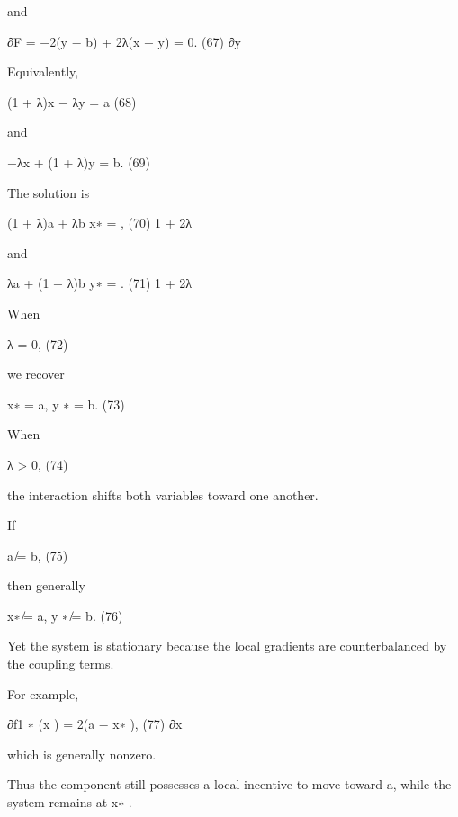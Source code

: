 \documentclass[10pt,a4paper]{article}
\begin{document}
\begin{ManuscriptText}
and

                               ∂F
                                  = −2(y − b) + 2λ(x − y) = 0.    (67)
                               ∂y

Equivalently,


                                      (1 + λ)x − λy = a           (68)

and


                                     −λx + (1 + λ)y = b.          (69)

The solution is

                                            (1 + λ)a + λb
                                     x∗ =                 ,       (70)
                                                1 + 2λ

and

                                            λa + (1 + λ)b
                                     y∗ =                 .       (71)
                                               1 + 2λ

When


                                             λ = 0,               (72)

we recover


                                      x∗ = a,         y ∗ = b.    (73)

When


                                             λ > 0,               (74)

the interaction shifts both variables toward one another.

If


                                             a ̸= b,              (75)

then generally


                                      x∗ ̸= a,        y ∗ ̸= b.   (76)


Yet the system is stationary because the local gradients are counterbalanced by the coupling
terms.

For example,

                                       ∂f1 ∗
                                          (x ) = 2(a − x∗ ),                               (77)
                                       ∂x

which is generally nonzero.

Thus the component still possesses a local incentive to move toward a, while the system remains
at x∗ .


\end{ManuscriptText}
\end{document}
